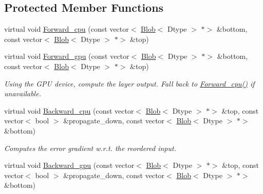 \subsection*{Protected Member Functions}
\begin{DoxyCompactItemize}
\item 
virtual void \mbox{\hyperlink{classcaffe_1_1_batch_reindex_layer_af7de3792af32dc8025c359700bd40b5e}{Forward\+\_\+cpu}} (const vector$<$ \mbox{\hyperlink{classcaffe_1_1_blob}{Blob}}$<$ Dtype $>$ $\ast$$>$ \&bottom, const vector$<$ \mbox{\hyperlink{classcaffe_1_1_blob}{Blob}}$<$ Dtype $>$ $\ast$$>$ \&top)
\item 
\mbox{\label{classcaffe_1_1_batch_reindex_layer_aa1535f3f9332348dee1a491465f495ed}} 
virtual void \mbox{\hyperlink{classcaffe_1_1_batch_reindex_layer_aa1535f3f9332348dee1a491465f495ed}{Forward\+\_\+gpu}} (const vector$<$ \mbox{\hyperlink{classcaffe_1_1_blob}{Blob}}$<$ Dtype $>$ $\ast$$>$ \&bottom, const vector$<$ \mbox{\hyperlink{classcaffe_1_1_blob}{Blob}}$<$ Dtype $>$ $\ast$$>$ \&top)
\begin{DoxyCompactList}\small\item\em Using the G\+PU device, compute the layer output. Fall back to \mbox{\hyperlink{classcaffe_1_1_batch_reindex_layer_af7de3792af32dc8025c359700bd40b5e}{Forward\+\_\+cpu()}} if unavailable. \end{DoxyCompactList}\item 
virtual void \mbox{\hyperlink{classcaffe_1_1_batch_reindex_layer_a8306bf8f4c49c33fc2a7cecbb436e5dc}{Backward\+\_\+cpu}} (const vector$<$ \mbox{\hyperlink{classcaffe_1_1_blob}{Blob}}$<$ Dtype $>$ $\ast$$>$ \&top, const vector$<$ bool $>$ \&propagate\+\_\+down, const vector$<$ \mbox{\hyperlink{classcaffe_1_1_blob}{Blob}}$<$ Dtype $>$ $\ast$$>$ \&bottom)
\begin{DoxyCompactList}\small\item\em Computes the error gradient w.\+r.\+t. the reordered input. \end{DoxyCompactList}\item 
\mbox{\label{classcaffe_1_1_batch_reindex_layer_a2d561aef5ce7e09115af143c553e7af5}} 
virtual void \mbox{\hyperlink{classcaffe_1_1_batch_reindex_layer_a2d561aef5ce7e09115af143c553e7af5}{Backward\+\_\+gpu}} (const vector$<$ \mbox{\hyperlink{classcaffe_1_1_blob}{Blob}}$<$ Dtype $>$ $\ast$$>$ \&top, const vector$<$ bool $>$ \&propagate\+\_\+down, const vector$<$ \mbox{\hyperlink{classcaffe_1_1_blob}{Blob}}$<$ Dtype $>$ $\ast$$>$ \&bottom)

\end{DoxyCompactItemize}
